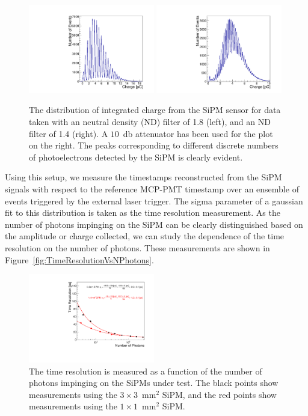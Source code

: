 \begin{figure}[htbp] 
\centering
\includegraphics[width=0.49\textwidth]{figures/NPhotons1.pdf} 
\includegraphics[width=0.49\textwidth]{figures/NPhotons2.pdf} 
\caption{The distribution of integrated charge from the SiPM sensor for data 
taken with an neutral density (ND) filter of 1.8 (left), and an ND filter of 1.4 (right). 
A $10$~db attenuator has been used for the plot on the right. The peaks corresponding
to different discrete numbers of photoelectrons detected by the SiPM is clearly
evident.} 
\label{fig:NPhotonPeaks} 
\end{figure} 

Using this setup, we measure the timestamps reconstructed from the SiPM signals
with respect to the reference MCP-PMT timestamp over an ensemble of events
triggered by the external laser trigger. The sigma parameter of a gaussian fit
to this distribution is taken as the time resolution measurement.
As the number of photons impinging on the SiPM can be clearly distinguished 
based on the amplitude or charge collected, we can study the dependence of the 
time resolution on the number of photons. These measurements are shown in 
Figure~\ref{fig:TimeResolutionVsNPhotons}.


\begin{figure}[htbp] 
\centering
\includegraphics[width=0.49\textwidth]{figures/TimeResolutionVsNPhotons.pdf}
\caption{ The time resolution is measured as a function of the number of photons 
impinging on the SiPMs under test. The black points show measurements using the
$3\times3$~$\mathrm{mm}^{2}$ SiPM, and the red points show measurements
using the $1\times1$~$\mathrm{mm}^{2}$ SiPM. \label{fig:TimeResolutionVsNPhotons}
} 
\label{fig:pulses} 
\end{figure} 


